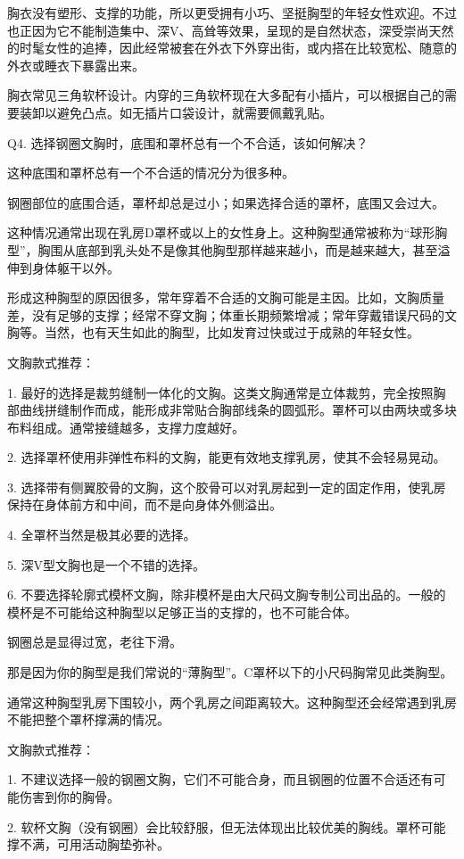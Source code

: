\documentclass[12pt,UTF8]{ctexbook}
\begin{document}
胸衣没有塑形、支撑的功能，所以更受拥有小巧、坚挺胸型的年轻女性欢迎。不过也正因为它不能制造集中、深V、高耸等效果，呈现的是自然状态，深受崇尚天然的时髦女性的追捧，因此经常被套在外衣下外穿出街，或内搭在比较宽松、随意的外衣或睡衣下暴露出来。

胸衣常见三角软杯设计。内穿的三角软杯现在大多配有小插片，可以根据自己的需要装卸以避免凸点。如无插片口袋设计，就需要佩戴乳贴。

Q4. 选择钢圈文胸时，底围和罩杯总有一个不合适，该如何解决？

这种底围和罩杯总有一个不合适的情况分为很多种。

钢圈部位的底围合适，罩杯却总是过小；如果选择合适的罩杯，底围又会过大。

这种情况通常出现在乳房D罩杯或以上的女性身上。这种胸型通常被称为“球形胸型”，胸围从底部到乳头处不是像其他胸型那样越来越小，而是越来越大，甚至溢伸到身体躯干以外。

形成这种胸型的原因很多，常年穿着不合适的文胸可能是主因。比如，文胸质量差，没有足够的支撑；经常不穿文胸；体重长期频繁增减；常年穿戴错误尺码的文胸等。当然，也有天生如此的胸型，比如发育过快或过于成熟的年轻女性。

文胸款式推荐：

1. 最好的选择是裁剪缝制一体化的文胸。这类文胸通常是立体裁剪，完全按照胸部曲线拼缝制作而成，能形成非常贴合胸部线条的圆弧形。罩杯可以由两块或多块布料组成。通常接缝越多，支撑力度越好。

2. 选择罩杯使用非弹性布料的文胸，能更有效地支撑乳房，使其不会轻易晃动。

3. 选择带有侧翼胶骨的文胸，这个胶骨可以对乳房起到一定的固定作用，使乳房保持在身体前方和中间，而不是向身体外侧溢出。

4. 全罩杯当然是极其必要的选择。

5. 深V型文胸也是一个不错的选择。

6. 不要选择轮廓式模杯文胸，除非模杯是由大尺码文胸专制公司出品的。一般的模杯是不可能给这种胸型以足够正当的支撑的，也不可能合体。

钢圈总是显得过宽，老往下滑。

那是因为你的胸型是我们常说的“薄胸型”。C罩杯以下的小尺码胸常见此类胸型。

通常这种胸型乳房下围较小，两个乳房之间距离较大。这种胸型还会经常遇到乳房不能把整个罩杯撑满的情况。

文胸款式推荐：

1. 不建议选择一般的钢圈文胸，它们不可能合身，而且钢圈的位置不合适还有可能伤害到你的胸骨。

2. 软杯文胸（没有钢圈）会比较舒服，但无法体现出比较优美的胸线。罩杯可能撑不满，可用活动胸垫弥补。
\end{document}
